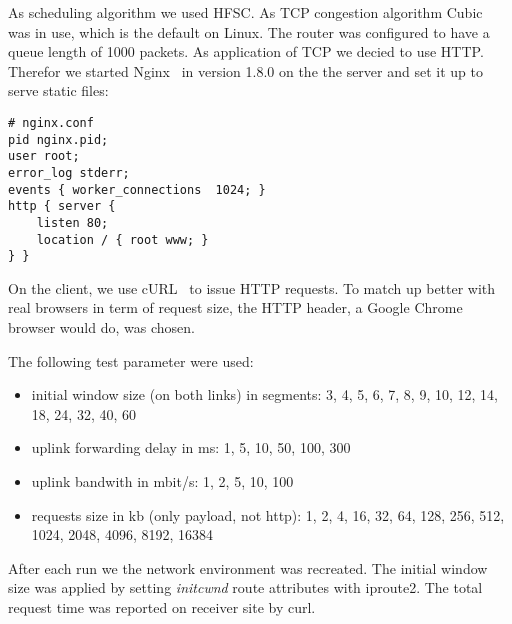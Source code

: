 As scheduling algorithm we used HFSC. As TCP congestion algorithm
Cubic~\cite{cubic} was in use, which is the default on Linux. The router was
configured to have a queue length of 1000 packets. As application of TCP we
decied to use HTTP. Therefor we started Nginx~\cite{nginx} in version 1.8.0 on
the the server and set it up to serve static files:

\begin{lstlisting}
# nginx.conf
pid nginx.pid;
user root;
error_log stderr;
events { worker_connections  1024; }
http { server {
    listen 80;
    location / { root www; }
} }
\end{lstlisting}

On the client, we use cURL~\cite{curl} to issue HTTP requests. To match up
better with real browsers in term of request size, the HTTP header, a Google
Chrome browser would do, was chosen.

The following test parameter were used:

\begin{itemize}
  \item initial window size (on both links) in segments: 3, 4, 5, 6, 7, 8, 9, 10, 12, 14, 18, 24, 32, 40, 60
  \item uplink forwarding delay in ms: 1, 5, 10, 50, 100, 300
  \item uplink bandwith in mbit/s: 1, 2, 5, 10, 100
  \item requests size in kb (only payload, not http): 1, 2, 4, 16, 32, 64, 128, 256, 512, 1024, 2048, 4096, 8192, 16384
\end{itemize}

After each run we the network environment was recreated. The initial window size
was applied by setting \emph{initcwnd} route attributes with iproute2. The total
request time was reported on receiver site by curl.
